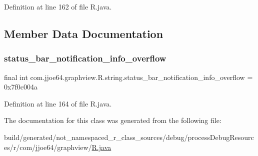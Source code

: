 Definition at line 162 of file R.\+java.


\begin{DoxyCode}{0}

\end{DoxyCode}


\subsection{Member Data Documentation}
\mbox{\label{classcom_1_1jjoe64_1_1graphview_1_1_r_1_1string_a7d583396aeb69569c8304e0e68da8c43}} 
\subsubsection{\texorpdfstring{status\_bar\_notification\_info\_overflow}{status\_bar\_notification\_info\_overflow}}
{\footnotesize\ttfamily final int com.\+jjoe64.\+graphview.\+R.\+string.\+status\+\_\+bar\+\_\+notification\+\_\+info\+\_\+overflow = 0x7f0c004a\hspace{0.3cm}{\ttfamily [static]}}



Definition at line 164 of file R.\+java.



The documentation for this class was generated from the following file\+:\begin{DoxyCompactItemize}
\item 
build/generated/not\+\_\+namespaced\+\_\+r\+\_\+class\+\_\+sources/debug/process\+Debug\+Resources/r/com/jjoe64/graphview/\mbox{\hyperlink{com_2jjoe64_2graphview_2_r_8java}{R.\+java}}\end{DoxyCompactItemize}
